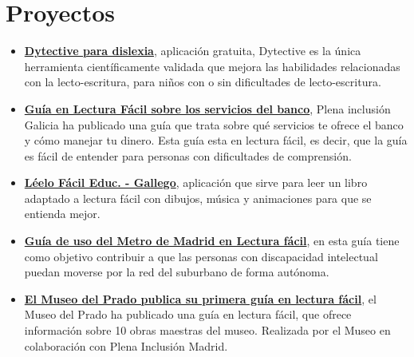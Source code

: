 \section{Proyectos}
\begin{itemize}
\item \href{https://play.google.com/store/apps/details?id=org.changedyslexia.newdytective}{\textbf{Dytective para dislexia}}, aplicación gratuita, Dytective es la única herramienta científicamente validada que mejora las habilidades relacionadas con la lecto-escritura, para niños con o sin dificultades de lecto-escritura.
\item \href{https://www.lecturafacilextremadura.es/guia-en-lectura-facil-sobre-los-servicios-del-banco/}{\textbf{Guía en Lectura Fácil sobre los servicios del banco}}, Plena inclusión Galicia ha publicado una guía que trata sobre qué servicios te ofrece el banco y cómo manejar tu dinero. Esta guía esta en lectura fácil, es decir, que la guía es fácil de entender para personas con dificultades de comprensión.

\item \href{https://apkpure.com/es/l\%C3\%A9elo-f\%C3\%A1cil-educ-gallego/com.oneclick.ga.rayoluna}{\textbf{Léelo Fácil Educ. - Gallego}}, aplicación que sirve para leer un libro adaptado a lectura fácil
con dibujos, música y animaciones para que se entienda mejor.
\item
\href{https://plenainclusionmadrid.org/recursos/guia-de-uso-del-metro-de-madrid-en-lectura-facil/}{\textbf{Guía de uso del Metro de Madrid en Lectura fácil}}, en esta guía tiene como objetivo contribuir a que las personas con discapacidad intelectual puedan moverse por la red del suburbano de forma autónoma.
\item
\href{https://plenainclusionmadrid.org/noticias/el-museo-del-prado-guia-en-lectura-facil/}{\textbf{El Museo del Prado publica su primera guía en lectura fácil}}, el Museo del Prado ha publicado una guía en lectura fácil, que ofrece información sobre 10 obras maestras del museo. Realizada por el Museo en colaboración con Plena Inclusión Madrid.
\end{itemize}



